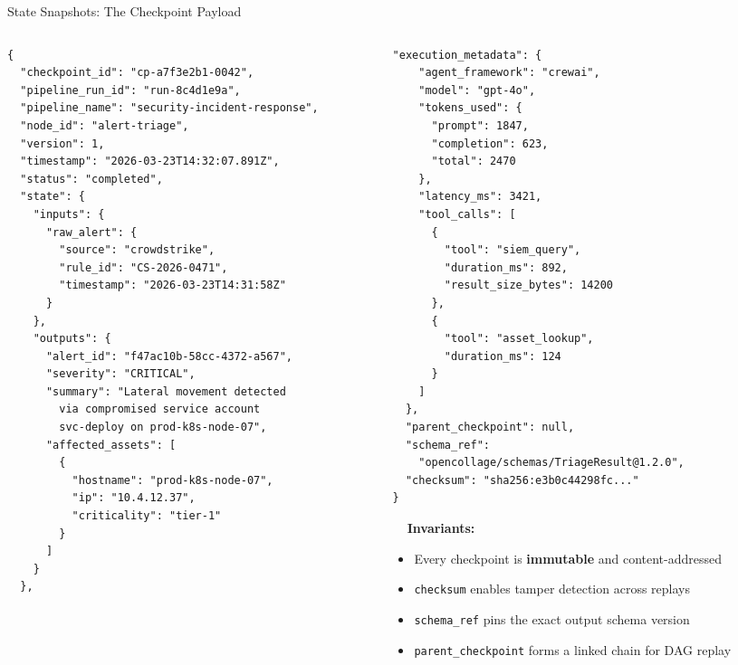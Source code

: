 \begin{frame}[fragile]{State Snapshots: The Checkpoint Payload}
  \vspace{-0.2cm}
  \begin{columns}[T]
    \begin{column}{0.52\textwidth}
      \begin{lstlisting}[style=jsonstyle,basicstyle=\ttfamily\fontsize{4}{4.8}\selectfont,title={\tiny\bfseries State Checkpoint (after alert-triage)}]
{
  "checkpoint_id": "cp-a7f3e2b1-0042",
  "pipeline_run_id": "run-8c4d1e9a",
  "pipeline_name": "security-incident-response",
  "node_id": "alert-triage",
  "version": 1,
  "timestamp": "2026-03-23T14:32:07.891Z",
  "status": "completed",
  "state": {
    "inputs": {
      "raw_alert": {
        "source": "crowdstrike",
        "rule_id": "CS-2026-0471",
        "timestamp": "2026-03-23T14:31:58Z"
      }
    },
    "outputs": {
      "alert_id": "f47ac10b-58cc-4372-a567",
      "severity": "CRITICAL",
      "summary": "Lateral movement detected
        via compromised service account
        svc-deploy on prod-k8s-node-07",
      "affected_assets": [
        {
          "hostname": "prod-k8s-node-07",
          "ip": "10.4.12.37",
          "criticality": "tier-1"
        }
      ]
    }
  },
      \end{lstlisting}
    \end{column}
    \begin{column}{0.48\textwidth}
      \begin{lstlisting}[style=jsonstyle,basicstyle=\ttfamily\fontsize{4}{4.8}\selectfont,title={\tiny\bfseries State Checkpoint (cont.)}]
  "execution_metadata": {
    "agent_framework": "crewai",
    "model": "gpt-4o",
    "tokens_used": {
      "prompt": 1847,
      "completion": 623,
      "total": 2470
    },
    "latency_ms": 3421,
    "tool_calls": [
      {
        "tool": "siem_query",
        "duration_ms": 892,
        "result_size_bytes": 14200
      },
      {
        "tool": "asset_lookup",
        "duration_ms": 124
      }
    ]
  },
  "parent_checkpoint": null,
  "schema_ref":
    "opencollage/schemas/TriageResult@1.2.0",
  "checksum": "sha256:e3b0c44298fc..."
}
      \end{lstlisting}

      \vspace{0.0cm}

      \fontsize{5}{6}\selectfont
      \textbf{\ \ Invariants:}
      \begin{itemize}
        \setlength{\itemsep}{0pt}
        \item Every checkpoint is \textbf{immutable} and content-addressed
        \item \texttt{checksum} enables tamper detection across replays
        \item \texttt{schema\_ref} pins the exact output schema version
        \item \texttt{parent\_checkpoint} forms a linked chain for DAG replay
      \end{itemize}
    \end{column}
  \end{columns}
\end{frame}
